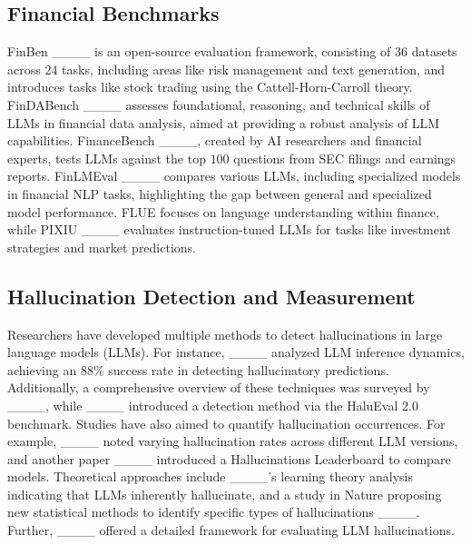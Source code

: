 
\subsection{Financial Benchmarks}

FinBen ____ is an open-source evaluation framework, consisting of 36 datasets across $24$ tasks, including areas like risk management and text generation, and introduces tasks like stock trading using the Cattell-Horn-Carroll theory. FinDABench ____ assesses foundational, reasoning, and technical skills of LLMs in financial data analysis, aimed at providing a robust analysis of LLM capabilities. FinanceBench ____, created by AI researchers and financial experts, tests LLMs against the top $100$ questions from SEC filings and earnings reports.
FinLMEval ____ compares various LLMs, including specialized models in financial NLP tasks, highlighting the gap between general and specialized model performance. FLUE focuses on language understanding within finance, while PIXIU ____ evaluates instruction-tuned LLMs for tasks like investment strategies and market predictions.

\subsection{Hallucination Detection and Measurement}
Researchers have developed multiple methods to detect hallucinations in large language models (LLMs). For instance, ____ analyzed LLM inference dynamics, achieving an 88\% success rate in detecting hallucinatory predictions. Additionally, a comprehensive overview of these techniques was surveyed by ____, while ____ introduced a detection method via the HaluEval 2.0 benchmark. Studies have also aimed to quantify hallucination occurrences. For example, ____ noted varying hallucination rates across different LLM versions, and another paper ____ introduced a Hallucinations Leaderboard to compare models. Theoretical approaches include ____'s learning theory analysis indicating that LLMs inherently hallucinate, and a study in Nature proposing new statistical methods to identify specific types of hallucinations ____. Further, ____ offered a detailed framework for evaluating LLM hallucinations. 
